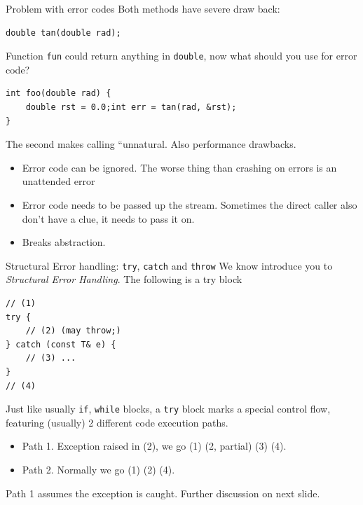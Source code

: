 \begin{frame}[fragile]{Problem with error codes}
Both methods have severe draw back:
\begin{verbatim}
double tan(double rad);
\end{verbatim}
Function \texttt{fun} could return anything in \texttt{double}, now what should you use for error code?
\begin{verbatim}
int foo(double rad) {
    double rst = 0.0;int err = tan(rad, &rst);
}
\end{verbatim}
The second makes calling ``unnatural. Also performance drawbacks. 
\begin{itemize}
	\item Error code can be ignored. The worse thing than crashing on errors is an unattended error
	\item Error code needs to be passed up the stream. Sometimes the direct caller also don't have a clue, it needs to pass it on. 
	\item Breaks abstraction.
\end{itemize}
\end{frame}

\begin{frame}[fragile]{Structural Error handling: \texttt{try}, \texttt{catch} and \texttt{throw}}
We know introduce you to \textit{Structural Error Handling}. The following is a try block
\begin{verbatim}
// (1)
try {
    // (2) (may throw;)
} catch (const T& e) {
    // (3) ...
}
// (4)
\end{verbatim}
Just like usually \texttt{if}, \texttt{while} blocks, a \texttt{try} block marks a special control flow, featuring (usually) 2 different code execution paths.
\begin{itemize}
	\item Path 1. Exception raised in (2), we go (1) (2, partial) (3) (4).
	\item Path 2. Normally we go (1) (2) (4).
\end{itemize}
Path 1 assumes the exception is caught. Further discussion on next slide.
\end{frame}

